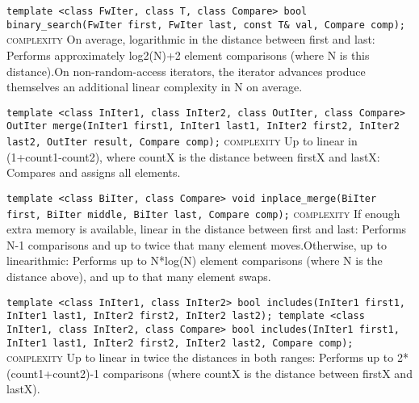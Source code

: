 \noindent{}\hspace*{0.25em}\lstinline[basicstyle=\ttfamily\color{corange}]{template <class FwIter, class T, class Compare> bool binary_search(FwIter first, FwIter last, const T& val, Compare comp);} \textsc{complexity} On average, logarithmic in the distance between first and last: Performs approximately log2(N)+2 element comparisons (where N is this distance).On non-random-access iterators, the iterator advances produce themselves an additional linear complexity in N on average.\\\vspace{-0.6em}

\noindent{}\hspace*{0.25em}\lstinline[basicstyle=\ttfamily\color{corange}]{template <class InIter1, class InIter2, class OutIter, class Compare> OutIter merge(InIter1 first1, InIter1 last1, InIter2 first2, InIter2 last2, OutIter result, Compare comp);} \textsc{complexity} Up to linear in (1+count1-count2), where countX is the distance between firstX and lastX: Compares and assigns all elements.\\\vspace{-0.6em}

\noindent{}\hspace*{0.25em}\lstinline[basicstyle=\ttfamily\color{cred}]{template <class BiIter, class Compare> void inplace_merge(BiIter first, BiIter middle, BiIter last, Compare comp);} \textsc{complexity} If enough extra memory is available, linear in the distance between first and last: Performs N-1 comparisons and up to twice that many element moves.Otherwise, up to linearithmic: Performs up to N*log(N) element comparisons (where N is the distance above), and up to that many element swaps.\\\vspace{-0.6em}

\noindent{}\hspace*{0.25em}\lstinline[basicstyle=\ttfamily\color{corange}]{template <class InIter1, class InIter2> bool includes(InIter1 first1, InIter1 last1, InIter2 first2, InIter2 last2); template <class InIter1, class InIter2, class Compare> bool includes(InIter1 first1, InIter1 last1, InIter2 first2, InIter2 last2, Compare comp);} \textsc{complexity} Up to linear in twice the distances in both ranges: Performs up to 2*(count1+count2)-1 comparisons (where countX is the distance between firstX and lastX).\\\vspace{-0.6em}

